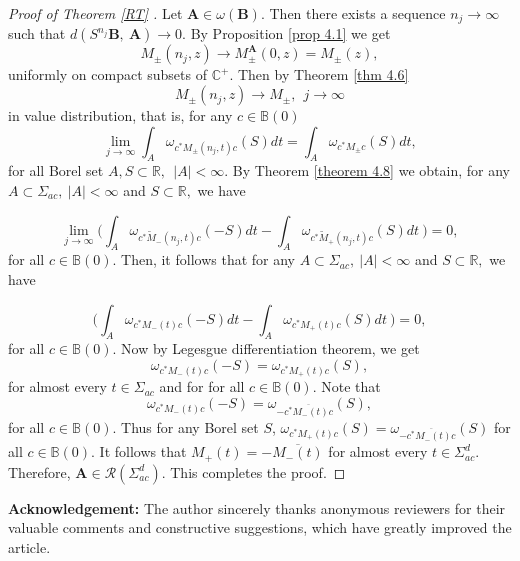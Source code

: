 \documentclass[reqno]{amsart}
\numberwithin{equation}{section}
\newcommand{\C}{\mathbb{C}}
\newcommand{\R}{\mathbb{R}}
\begin{document}
\begin{proof}[Proof of Theorem \ref{RT} ] Let $ \mathbf A \in \omega (\mathbf B)  .$ Then there exists a sequence $n_j \rightarrow \infty $ such that $d(S^{n_j} \mathbf B, \  \mathbf A )  \rightarrow 0.$ By Proposition \ref{prop 4.1}  we get
\[ M_{\pm}(n_j, z) \rightarrow M_{\pm}^ \mathbf A (0,z) = M_{\pm}(z) , \] uniformly on compact subsets of $\C^+$. Then by Theorem \ref{thm 4.6}
\[ 
M_{\pm}(n_j, z) \rightarrow M_{\pm}, \ \  j \rightarrow \infty 
\]
in value distribution, that is, for any $ c\in \mathbb B(0)$ 
\begin{equation} 
\lim_{j \rightarrow \infty }  \int_A \omega_{c^*M_{\pm }(n_j, t)c}(S) dt = \int_A \omega_{c^* M_{\pm } c}(S) dt ,
\end{equation} 
for all Borel set $A, S \subset \R ,\ \ |A| < \infty .$ By Theorem \ref{theorem 4.8} we obtain, for any $A \subset \Sigma_{ac}, \ |A| < \infty $ and $S \subset \R,$ we have

\begin{equation*}
\lim_{j \rightarrow \infty}\Big ( \int_A \omega_{c^* \tilde M_-(n_j,t)c} (-S) dt -\int_A \omega_{c^* \tilde M_+(n_j,t)c}(S) dt\ \Big ) = 0,
\end{equation*} 
for all $c\in \mathbb B(0).$ Then,  it follows that for any $A \subset \Sigma_{ac}, \ |A| < \infty $ and $S \subset \R,$ we have

\begin{equation*}  \Big ( \int_A \omega_{c^*   M_-(t)c} (-S) dt -\int_A \omega_{c^*   M_+(t)c}(S) dt\ \Big ) = 0,
\end{equation*} for all $c\in \mathbb B(0).$
Now by Legesgue differentiation theorem, we get
$$
\omega_{c^*   M_-(t)c} (-S) =  \omega_{c^*   M_+(t)c}(S) , 
$$ for almost every $t\in \Sigma_{ac}$ and for for all $ c\in \mathbb B(0).$ Note that 
$$
\omega_{c^*   M_-(t)c} (-S) = \omega_{- \overline { c^*  M_-(t)c} } (S),
$$
for all $c\in \mathbb B(0).$ Thus for any Borel set $S$,  $ \omega_{c^*  M_+(t)c} (S) =  \omega_{- \overline { c^* M_-(t)c} } (S)$ for all $c\in \mathbb B(0).$ It follows that $ M_+(t) = -\overline {  M_-(t) } $ for almost every $t\in \Sigma_{ac}^d.$ Therefore,  $ \mathbf A \in \mathcal R ( \Sigma_{ac}^d) .$ This completes the proof.
\end{proof}


\textbf{Acknowledgement:} The author sincerely thanks anonymous reviewers for their valuable comments and constructive suggestions, which have greatly improved the article. 

  \providecommand{\bysame}{\leavevmode\hbox to3em{\hrulefill}\thinspace}
\providecommand{\MR}{\relax\ifhmode\unskip\space\fi MR }
\providecommand{\MRhref}[2]{%
  \href{http://www.ams.org/mathscinet-getitem?mr=#1}{#2}
}
\providecommand{\href}[2]{#2}
\end{document}
